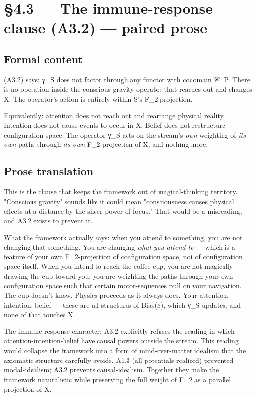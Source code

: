 \documentclass[11pt, openany]{book}
\newcommand{\sectionbreak}{\clearpage}
\begin{document}
\sectionbreak

\section{§4.3 --- The immune-response clause (A3.2) --- paired prose}

\subsection{Formal content}

(A3.2) says: γ\_\allowbreak{}S does not factor through any functor with codomain 𝒞\_\allowbreak{}P. There is no operation inside the conscious-gravity operator that reaches out and changes X. The operator's action is entirely within S's F\_\allowbreak{}2-projection.

Equivalently: attention does not reach out and rearrange physical reality. Intention does not cause events to occur in X. Belief does not restructure configuration space. The operator γ\_\allowbreak{}S acts on the stream's \textit{own} weighting of \textit{its own} paths through \textit{its own} F\_\allowbreak{}2-projection of X, and nothing more.

\subsection{Prose translation}

This is the clause that keeps the framework out of magical-thinking territory. "Conscious gravity" sounds like it could mean "consciousness causes physical effects at a distance by the sheer power of focus." That would be a misreading, and A3.2 exists to prevent it.

What the framework actually says: when you attend to something, you are not changing that something. You are changing \textit{what you attend to} --- which is a feature of your own F\_\allowbreak{}2-projection of configuration space, not of configuration space itself. When you intend to reach the coffee cup, you are not magically drawing the cup toward you; you are weighting the paths through your own configuration space such that certain motor-sequences pull on your navigation. The cup doesn't know. Physics proceeds as it always does. Your attention, intention, belief --- these are all structures of Bias(S), which γ\_\allowbreak{}S updates, and none of that touches X.

The immune-response character: A3.2 explicitly refuses the reading in which attention-intention-belief have causal powers outside the stream. This reading would collapse the framework into a form of mind-over-matter idealism that the axiomatic structure carefully avoids. A1.3 (all-potentials-realized) prevented modal-idealism; A3.2 prevents causal-idealism. Together they make the framework naturalistic while preserving the full weight of F\_\allowbreak{}2 as a parallel projection of X.
\end{document}
